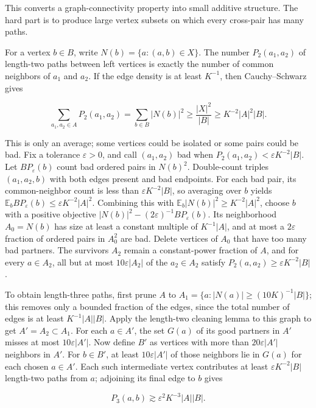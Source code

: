 This converts a graph-connectivity property into small additive structure. The hard part is to produce large vertex subsets on which every cross-pair has many paths.

For a vertex \(b\in B\), write \(N(b)=\{a:(a,b)\in X\}\). The number \(P_2(a_1,a_2)\) of length-two paths between left vertices is exactly the number of common neighbors of \(a_1\) and \(a_2\). If the edge density is at least \(K^{-1}\), then Cauchy--Schwarz gives

\[\sum_{a_1,a_2\in A}P_2(a_1,a_2)=\sum_{b\in B}|N(b)|^2\ge \frac{|X|^2}{|B|}\ge K^{-2}|A|^2|B|.\]

This is only an average; some vertices could be isolated or some pairs could be bad. Fix a tolerance \(\varepsilon>0\), and call \((a_1,a_2)\) bad when \(P_2(a_1,a_2)<\varepsilon K^{-2}|B|\). Let \(BP_\varepsilon(b)\) count bad ordered pairs in \(N(b)^2\). Double-count triples \((a_1,a_2,b)\) with both edges present and bad endpoints. For each bad pair, its common-neighbor count is less than \(\varepsilon K^{-2}|B|\), so averaging over \(b\) yields \(\mathbb E_b BP_\varepsilon(b)\le\varepsilon K^{-2}|A|^2\). Combining this with \(\mathbb E_b|N(b)|^2\ge K^{-2}|A|^2\), choose \(b\) with a positive objective \(|N(b)|^2-(2\varepsilon)^{-1}BP_\varepsilon(b)\). Its neighborhood \(A_0=N(b)\) has size at least a constant multiple of \(K^{-1}|A|\), and at most a \(2\varepsilon\) fraction of ordered pairs in \(A_0^2\) are bad. Delete vertices of \(A_0\) that have too many bad partners. The survivors \(A_2\) remain a constant-power fraction of \(A\), and for every \(a\in A_2\), all but at most \(10\varepsilon|A_2|\) of the \(a_2\in A_2\) satisfy \(P_2(a,a_2)\ge\varepsilon K^{-2}|B|\).

To obtain length-three paths, first prune \(A\) to \(A_1=\{a:|N(a)|\ge (10K)^{-1}|B|\}\); this removes only a bounded fraction of the edges, since the total number of edges is at least \(K^{-1}|A||B|\). Apply the length-two cleaning lemma to this graph to get \(A'=A_2\subset A_1\). For each \(a\in A'\), the set \(G(a)\) of its good partners in \(A'\) misses at most \(10\varepsilon|A'|\). Now define \(B'\) as vertices with more than \(20\varepsilon|A'|\) neighbors in \(A'\). For \(b\in B'\), at least \(10\varepsilon|A'|\) of those neighbors lie in \(G(a)\) for each chosen \(a\in A'\). Each such intermediate vertex contributes at least \(\varepsilon K^{-2}|B|\) length-two paths from \(a\); adjoining its final edge to \(b\) gives

\[P_3(a,b)\gtrsim \varepsilon^2K^{-3}|A||B|.\]

